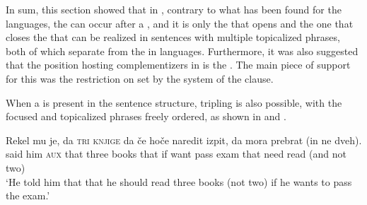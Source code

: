 \documentclass[output=paper,colorlinks,citecolor=brown]{langsci/langscibook}
\begin{document}
\begin{exe}
\ex \begin{xlist}\label{ex:plesnicar:42}

\end{xlist}
\end{exe}

\noindent In sum, this section showed that in , contrary to what has been found for the  languages, the   can occur after a , and it is only the  that opens and the one that closes the  that can be realized in sentences with multiple topicalized phrases, both of which separate   from the  in  languages. Furthermore, it was also suggested that the position hosting  complementizers in  is the . The main piece of support for this was the restriction on   set by the  system of the clause.

When a  is present in the sentence structure,  tripling is also possible, with the focused and topicalized phrases freely ordered, as shown in  and .

\begin{exe}
\ex \label{ex:plesnicar:43}
\gll Rekel	mu	je,	da	\textsc{tri} \textsc{knjige} da	če	hoče	naredit	izpit, da	mora 	prebrat (in ne dveh).\\
  said	him	\textsc{aux} that	three books	that	if	want	pass	exam that	need	read	(and not two)\\
\trans `He told him that that he should read three books (not two) if he wants to pass the exam.'
\end{exe}
\end{document}
